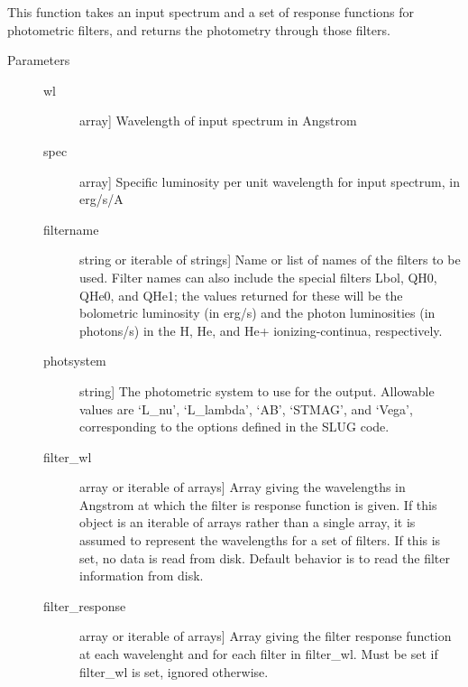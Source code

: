 \documentclass[letterpaper,10pt,english]{sphinxmanual}
\begin{document}
\begin{fulllineitems}
\label{\detokenize{slugpy:slugpy.compute_photometry}}
This function takes an input spectrum and a set of response
functions for photometric filters, and returns the photometry
through those filters.
\begin{description}
\item[{Parameters}] \leavevmode\begin{description}
\item[{wl}] \leavevmode{[}array{]}
Wavelength of input spectrum in Angstrom

\item[{spec}] \leavevmode{[}array{]}
Specific luminosity per unit wavelength for input spectrum, in
erg/s/A

\item[{filtername}] \leavevmode{[}string or iterable of strings{]}
Name or list of names of the filters to be used. Filter names
can also include the special filters Lbol, QH0, QHe0, and QHe1;
the values returned for these will be the bolometric luminosity
(in erg/s) and the photon luminosities (in photons/s) in the H,
He, and He+ ionizing-continua, respectively.

\item[{photsystem}] \leavevmode{[}string{]}
The photometric system to use for the output. Allowable values
are ‘L\_nu’, ‘L\_lambda’, ‘AB’, ‘STMAG’, and ‘Vega’,
corresponding to the options defined in the SLUG code.

\item[{filter\_wl}] \leavevmode{[}array or iterable of arrays{]}
Array giving the wavelengths in Angstrom at which the filter is
response function is given. If this object is an iterable of
arrays rather than a single array, it is assumed to represent
the wavelengths for a set of filters. If this is set,
no data is read from disk. Default behavior is to read the
filter information from disk.

\item[{filter\_response}] \leavevmode{[}array or iterable of arrays{]}
Array giving the filter response function at each wavelenght
and for each filter in filter\_wl. Must be set if filter\_wl is
set, ignored otherwise.


\end{description}
\end{description}
\end{fulllineitems}
\end{document}

